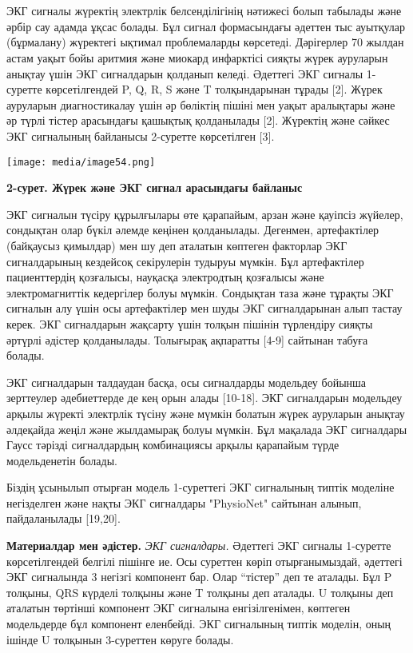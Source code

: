 \documentclass[
]{article}
\begin{document}
\section{}\label{section-9}

ЭКГ сигналы жүректің электрлік белсенділігінің нәтижесі болып табылады
және әрбір сау адамда ұқсас болады. Бұл сигнал формасындағы әдеттен тыс
ауытқулар (бұрмалану) жүректегі ықтимал проблемаларды көрсетеді.
Дәрігерлер 70 жылдан астам уақыт бойы аритмия және миокард инфарктісі
сияқты жүрек ауруларын анықтау үшін ЭКГ сигналдарын қолданып келеді.
Әдеттегі ЭКГ сигналы 1-суретте көрсетілгендей P, Q, R, S және T
толқындарынан тұрады {[}2{]}. Жүрек ауруларын диагностикалау үшін әр
бөліктің пішіні мен уақыт аралықтары және әр түрлі тістер арасындағы
қашықтық қолданылады {[}2{]}. Жүректің және сәйкес ЭКГ сигналының
байланысы 2-суретте көрсетілген {[}3{]}.

\texttt{[image: media/image54.png]}

\textbf{2-сурет. Жүрек және ЭКГ сигнал арасындағы байланыс}

ЭКГ сигналын түсіру құрылғылары өте қарапайым, арзан және қауіпсіз
жүйелер, сондықтан олар бүкіл әлемде кеңінен қолданылады. Дегенмен,
артефактілер (байқаусыз қимылдар) мен шу деп аталатын көптеген факторлар
ЭКГ сигналдарының кездейсоқ секірулерін тудыруы мүмкін. Бұл артефактілер
пациенттердің қозғалысы, науқасқа электродтың қозғалысы және
электромагниттік кедергілер болуы мүмкін. Сондықтан таза және тұрақты
ЭКГ сигналын алу үшін осы артефактілер мен шуды ЭКГ сигналдарынан алып
тастау керек. ЭКГ сигналдарын жақсарту үшін толқын пішінін түрлендіру
сияқты әртүрлі әдістер қолданылады. Толығырақ ақпаратты {[}4-9{]}
сайтынан табуға болады.

ЭКГ сигналдарын талдаудан басқа, осы сигналдарды модельдеу бойынша
зерттеулер әдебиеттерде де кең орын алады {[}10-18{]}. ЭКГ сигналдарын
модельдеу арқылы жүректі электрлік түсіну және мүмкін болатын жүрек
ауруларын анықтау әлдеқайда жеңіл және жылдамырақ болуы мүмкін. Бұл
мақалада ЭКГ сигналдары Гаусс тәрізді сигналдардың комбинациясы арқылы
қарапайым түрде модельденетін болады.

Біздің ұсынылып отырған модель 1-суреттегі ЭКГ сигналының типтік
моделіне негізделген және нақты ЭКГ сигналдары "PhysioNet" сайтынан
алынып, пайдаланылады {[}19,20{]}.

\textbf{Материалдар мен әдістер.} \emph{ЭКГ сигналдары.} Әдеттегі ЭКГ
сигналы 1-суретте көрсетілгендей белгілі пішінге ие. Осы суреттен көріп
отырғанымыздай, әдеттегі ЭКГ сигналында 3 негізгі компонент бар. Олар
``тістер'' деп те аталады. Бұл P толқыны, QRS күрделі толқыны және T
толқыны деп аталады. U толқыны деп аталатын төртінші компонент ЭКГ
сигналына енгізілгенімен, көптеген модельдерде бұл компонент еленбейді.
ЭКГ сигналының типтік моделін, оның ішінде U толқынын 3-суреттен көруге
болады.
\end{document}
